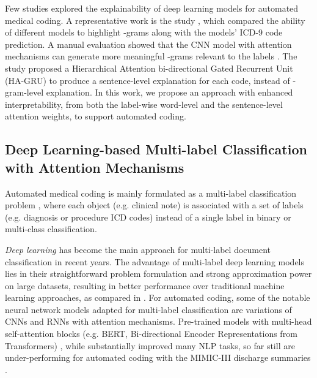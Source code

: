 \documentclass[final,5p,times,twocolumn]{elsarticle}
\begin{document}
Few studies explored the explainability of deep learning models for automated medical coding. A representative work is the study \cite{mullenbach-etal-2018-explainable}, which compared the ability of different models to highlight -grams along with the models' ICD-9 code prediction. A manual evaluation showed that the CNN model with attention mechanisms can generate more meaningful -grams relevant to the labels \cite{mullenbach-etal-2018-explainable}. The study \cite{baumel2018multi} proposed a Hierarchical Attention bi-directional Gated Recurrent Unit (HA-GRU) to produce a sentence-level explanation for each code, instead of -gram-level explanation. In this work, we propose an approach with enhanced interpretability, from both the label-wise word-level and the sentence-level attention weights, to support automated coding.

\subsection{Deep Learning-based Multi-label Classification with Attention Mechanisms}
\label{rw:dl}
Automated medical coding is mainly formulated as a multi-label classification problem \cite{zhang2014,Tsoumakas2010,mullenbach-etal-2018-explainable,baumel2018multi}, where each object (e.g. clinical note) is associated with a set of labels (e.g. diagnosis or procedure ICD codes) instead of a single label in binary or multi-class classification.

\textit{Deep learning} has become the main approach for multi-label document classification \cite{Nam2014,dong2020} in recent years. The advantage of multi-label deep learning models lies in their straightforward problem formulation and strong approximation power on large datasets, resulting in better performance over traditional machine learning approaches, as compared in \cite{zhang2006,dong2020,karimi-etal-2017-automatic}. For automated coding, some of the notable neural network models adapted for multi-label classification are variations of CNNs \cite{karimi-etal-2017-automatic,mullenbach-etal-2018-explainable} and RNNs \cite{baumel2018multi} with attention mechanisms. Pre-trained models with multi-head self-attention blocks (e.g. BERT, Bi-directional Encoder Representations from Transformers) \cite{devlin-etal-2019-bert}, while substantially improved many NLP tasks, so far still are under-performing for automated coding with the MIMIC-III discharge summaries \cite{chalkidis2020empirical,Chen2020icd9bert}.
\end{document}

